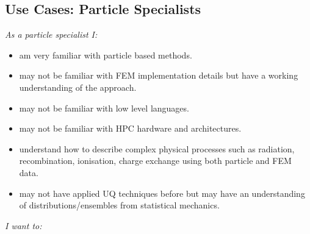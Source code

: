 \subsection{Use Cases: Particle Specialists}\label{sec:use-cases-particle-specialists}

\emph{As a particle specialist I:}

\begin{itemize}
\item am very familiar with particle based methods.
\item may not be familiar with FEM implementation details but have a working
  understanding of the approach.
\item may not be familiar with low level languages.
\item may not be familiar with HPC hardware and architectures.
\item understand how to describe complex physical processes such as
  radiation, recombination, ionisation, charge exchange using both
  particle and FEM data.
\item may not have applied UQ techniques before but may have an
  understanding of distributions/ensembles from statistical mechanics.
\end{itemize}

\emph{I want to:}


